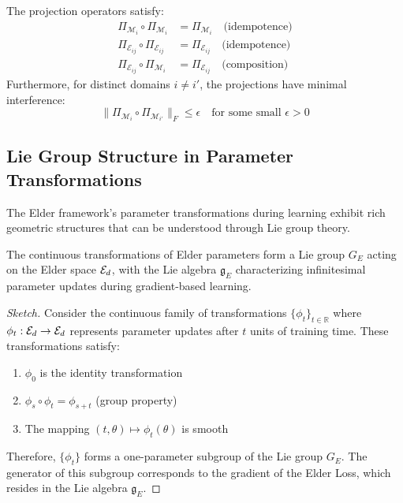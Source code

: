\begin{proposition}
The projection operators satisfy:
\begin{align}
\Pi_{\mathcal{M}_i} \circ \Pi_{\mathcal{M}_i} &= \Pi_{\mathcal{M}_i} \quad \text{(idempotence)}\\
\Pi_{\mathcal{E}_{ij}} \circ \Pi_{\mathcal{E}_{ij}} &= \Pi_{\mathcal{E}_{ij}} \quad \text{(idempotence)}\\
\Pi_{\mathcal{E}_{ij}} \circ \Pi_{\mathcal{M}_i} &= \Pi_{\mathcal{E}_{ij}} \quad \text{(composition)}
\end{align}
Furthermore, for distinct domains $i \neq i'$, the projections have minimal interference:
\begin{equation}
\| \Pi_{\mathcal{M}_i} \circ \Pi_{\mathcal{M}_{i'}} \|_F \leq \epsilon \quad \text{for some small } \epsilon > 0
\end{equation}
\end{proposition}

\subsection{Lie Group Structure in Parameter Transformations}

The Elder framework's parameter transformations during learning exhibit rich geometric structures that can be understood through Lie group theory.

\begin{theorem}
The continuous transformations of Elder parameters form a Lie group $G_E$ acting on the Elder space $\mathcal{E}_{d}$, with the Lie algebra $\mathfrak{g}_E$ characterizing infinitesimal parameter updates during gradient-based learning.
\end{theorem}

\begin{proof}[Sketch]
Consider the continuous family of transformations $\{\phi_t\}_{t \in \mathbb{R}}$ where $\phi_t: \mathcal{E}_{d} \rightarrow \mathcal{E}_{d}$ represents parameter updates after $t$ units of training time. These transformations satisfy:
\begin{enumerate}
\item $\phi_0$ is the identity transformation
\item $\phi_s \circ \phi_t = \phi_{s+t}$ (group property)
\item The mapping $(t, \theta) \mapsto \phi_t(\theta)$ is smooth
\end{enumerate}
Therefore, $\{\phi_t\}$ forms a one-parameter subgroup of the Lie group $G_E$. The generator of this subgroup corresponds to the gradient of the Elder Loss, which resides in the Lie algebra $\mathfrak{g}_E$.
\end{proof}

